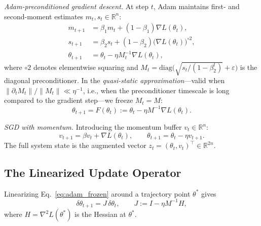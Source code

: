 \documentclass[aps,prresearch,twocolumn,superscriptaddress,longbibliography]{revtex4-2}
\newcommand{\R}{\mathbb{R}}
\newcommand{\diag}{\mathrm{diag}}
\begin{document}
\emph{Adam-preconditioned gradient descent.}
At step $t$, Adam maintains first- and second-moment estimates
$m_t, s_t \in \R^n$:
\begin{align}
m_{t+1} &= \beta_1 m_t + (1-\beta_1)\nabla L(\theta_t), \label{eq:adam_m}\\
s_{t+1} &= \beta_2 s_t + (1-\beta_2)\bigl(\nabla L(\theta_t)\bigr)^{\circ 2},
                                                      \label{eq:adam_s}\\
\theta_{t+1} &= \theta_t - \eta M_t^{-1}\nabla L(\theta_t), \label{eq:adam_theta}
\end{align}
where $\circ 2$ denotes elementwise squaring and
$M_t = \diag\!\bigl(\sqrt{s_t/(1-\beta_2^t)}+\varepsilon\bigr)$ is the
diagonal preconditioner.
In the \emph{quasi-static approximation}---valid when
$\|\partial_t M_t\|/\|M_t\| \ll \eta^{-1}$, i.e., when the preconditioner
timescale is long compared to the gradient step---we freeze $M_t = M$:
\begin{equation}
\theta_{t+1} = F(\theta_t) := \theta_t - \eta M^{-1}\nabla L(\theta_t).
\label{eq:adam_frozen}
\end{equation}

\emph{SGD with momentum.}
Introducing the momentum buffer $v_t\in\R^n$:
\begin{equation}
v_{t+1} = \beta v_t + \nabla L(\theta_t),\qquad
\theta_{t+1} = \theta_t - \eta v_{t+1}.
\label{eq:sgdm}
\end{equation}
The full system state is the augmented vector
$z_t = (\theta_t, v_t)^\top \in \R^{2n}$.

\subsection{The Linearized Update Operator}

Linearizing Eq.~\eqref{eq:adam_frozen} around a trajectory
point $\theta^*$ gives
\begin{equation}
\delta\theta_{t+1} = J\,\delta\theta_t,\qquad
J := I - \eta M^{-1}H,
\label{eq:jacobian}
\end{equation}
where $H = \nabla^2 L(\theta^*)$ is the Hessian at $\theta^*$.
\end{document}
